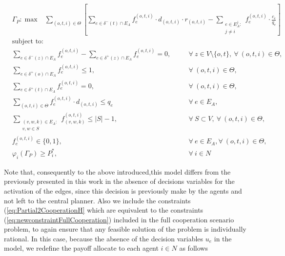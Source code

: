\documentclass[review]{elsarticle}
\begin{document}
\begin{align}
        &  \Gamma_P: \max  & \sum_{(o,t,i) \in \Theta} \left[\sum_{e \in \delta^-(t)\cap E_A}  f_e^{(o,t,i)} \cdot d_{(o,t,i)} \cdot r_{(o,t,i)} - \sum_{\substack{e \in E_A^j\colon \\ j\not = i}} f_e^{(o,t,i)} \cdot \frac{c_e}{q_e} \right] &&   \label{eq:Partial2CooperationA} 
    \end{align}
    \begin{align}
        & \text{subject to:}       && \nonumber\\
        & \sum_{e \in \delta^-(z)\cap E_A} f_e^{(o,t,i)}-\sum_{e \in \delta^+(z)\cap E_A} f_{e}^{(o,t,i)} = 0,            \quad && \forall\ z\in V\setminus\{o,t\},\ \forall\ (o,t,i)\in\Theta,  \label{eq:Partial2CooperationB}\\[1em]
& \sum_{e \in \delta^+(o)\cap E_A} f_e^{(o,t,i)} \leq 1,  && \forall\ (o,t,i)\in \Theta, \label{eq:Partial2CooperationC} \\
& \sum_{e \in \delta^+(t)\cap E_A} f_e^{(o,t,i)} = 0,  && \forall\ (o,t,i)\in \Theta, \label{eq:Partial2CooperationD} \\
 & \sum_{(o,t,i) \in \Theta} f_e^{(o,t,i)}\cdot d_{(o,t,i)} \leq q_e     && \forall\ e \in E_A, \label{eq:Partial2CooperationE}  \\
 & \sum_{\substack{(v,w,k) \in E_A\colon \\ v,w \in S}} f_{(v,w,k)}^{(o,t,i)}  \leq |S| -1,    && \forall\ S \subset V,\ \forall\ (o,t,i) \in \Theta, \label{eq:Partial2CooperationF}\\
 & f_e^{(o,t,i)}  \in \{0,1\},    && \forall\ e \in E_A, \forall\ (o,t,i) \in \Theta, \label{eq:Partial2CooperationG} \\
& \varphi_i(\Gamma_P)   \geq P_i^*,     && \forall\ i\in N \label{eq:Partial2CooperationH}
    \end{align}
   

Note that, consequently to the above introduced,this model differs from the previously presented in this work in the absence of decisions variables for the activation of the edges, since this decision is previously make by the agents and not left to the central planner. Also we include the constraints (\ref{eq:Partial2CooperationH}
which are equivalent to the constraints (\ref{eq:newconstraintFullCooperation}) included in the full cooperation scenario problem, to again ensure that any feasible solution of the problem is individually rational. In this case, because the absence of the decision variables $u_e$ in the model, we redefine the payoff allocate to each agent $i\in N$ as follows
\end{document}
